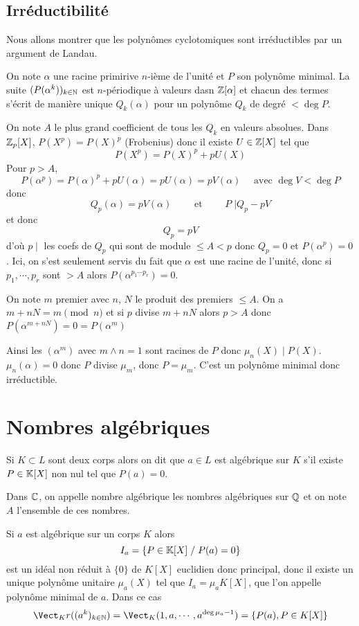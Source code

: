 \subsection{Irréductibilité}


Nous allons montrer que les polynômes cyclotomiques sont irréductibles par un argument de Landau.

On note $\alpha$ une racine primirive $n$-ième de l'unité et $P$ son polynôme minimal. La suite $(P(\alpha^k))_{k\in\mathbb N}$ est $n$-périodique à valeurs dasn $\mathbb Z[\alpha]$ et chacun des termes s'écrit  de manière unique $Q_k(\alpha)$ pour un polynôme $Q_k$ de degré $<\deg P$.

On note $A$ le plus grand coefficient de tous les $Q_k$ en valeurs absolues. Dans $\mathbb Z_p[X]$, $P(X^p)=P(X)^p$ (Frobenius) donc il existe $U\in\mathbb Z[X]$ tel que \[
    P(X^p)=P(X)^p+pU(X)
\]
Pour $p>A$, \[
    P(\alpha^p)=P(\alpha)^p+pU(\alpha)=pU(\alpha)=pV(\alpha) \quad \text{ avec }\deg V<\deg P
\]
donc \[
    Q_p(\alpha)=pV(\alpha) \qquad \text{ et }\qquad P\;|Q_p-pV
\]
et donc \[
    Q_p=pV
\]
d'où $p\;|\;$ les coefs de $Q_p$ qui sont de module $\leq A<p$ donc $Q_p=0$ et $P(\alpha^p)=0$. Ici, on s'est seulement servis du fait que $\alpha$ est une racine de l'unité, donc si $p_1, \cdots, p_r$ sont $>A$ alors $P(\alpha^{p_1\cdots p_r})=0$.

On note $m$ premier avec $n$, $N$ le produit des premiers $\leq A$. On a $m+nN=m\pmod n$ et si $p$ divise $m+nN$ alors $p>A$ donc $P(\alpha^{m+nN})=0=P(\alpha^m)$

Ainsi les $(\alpha^{m})$ avec $m\land n=1$ sont racines de $P$ donc $\mu_n(X) \;|\; P(X)$. $\mu_n(\alpha)=0$ donc $P$ divise $\mu_m$, donc $P=\mu_m$. C'est un polynôme minimal donc irréductible.

\section{Nombres algébriques}

Si $K\subset L$ sont deux corps alors on dit que $a\in L$ est algébrique sur $K$ s'il existe $P\in\mathbb K[X]$ non nul tel que $P(a)=0$.

Dans $\mathbb C$, on appelle nombre algébrique les nombres algébriques sur $\mathbb Q$ et on note $A$ l'ensemble de ces nombres.

\begin{rem}
Si $a$ est algébrique sur un corps $K$ alors \[
    I_a=\{P\in\mathbb K[X]\;/\; P(a)=0\}
\]
est un idéal non réduit à $\{0\}$ de $K[X]$ euclidien donc principal, donc il existe un unique polynôme unitaire $\mu_a(X)$ tel que $I_a=\mu_a K[X]$, que l'on appelle polynôme minimal de $a$. Dans ce cas \[
    \Vect_Kr((a^k)_{k\in\N})=\Vect_K(1, a, \cdots, a^{\deg \mu_a-1})=\{P(a), P\in K[X]\}
\]
\end{rem}

